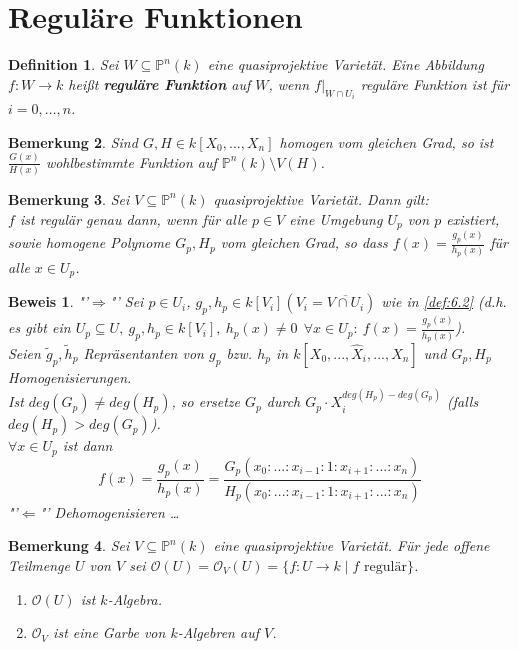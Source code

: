 \documentclass[a4paper,12pt]{report}
\theoremstyle{break}
\newtheorem{Def}{Definition}[section]
\newtheorem{Bem}[Def]{Bemerkung}
\theoremstyle{nonumberbreak}
\theoremstyle{nonumberplain}
\newtheorem{Bew}{Beweis}
\newcommand{\emp}[1]{\textbf{\emph{#1}}}
\newcommand{\begriff}[1]{{\index{#1}}\emp{#1}}
\begin{document}
\section{Reguläre Funktionen}
\begin{Def}
\label{def:10.1}
Sei $W\subseteq\mathbb{P}^n(k)$ eine quasiprojektive Varietät. Eine Abbildung $f:W\rightarrow k$ heißt \begriff{reguläre Funktion} auf $W$, wenn $f|_{W\cap U_i}$ reguläre Funktion ist für $i=0,\dots,n$.
\end{Def}
\begin{Bem}
\label{bem:10.2}
Sind $G,H\in k[X_0,...,X_n]$ homogen vom gleichen Grad, so ist $\frac{G(x)}{H(x)}$ wohlbestimmte Funktion auf $\mathbb{P}^n(k)\setminus V(H)$.
\end{Bem}

\begin{Bem}
\label{bem:10.3}
Sei $V\subseteq\mathbb{P}^n(k)$ quasiprojektive Varietät. Dann gilt:\\
$f$ ist regulär genau dann, wenn für alle $p\in V$ eine Umgebung $U_p$ von $p$ existiert, sowie homogene Polynome $G_p, H_p$ vom gleichen Grad, so dass $f(x)=\frac{g_p(x)}{h_p(x)}$ für alle $x\in U_p$.
\end{Bem}

\begin{Bew} "'$\Rightarrow$"' Sei $p\in U_i$, $g_p,h_p\in k[V_i](V_i=\overline{V\cap U_i})$ wie in \ref{def:6.2} (d.h. es gibt ein $U_p\subseteq U,~g_p,h_p\in k[V_i],~h_p(x)\neq 0 ~~\forall x\in U_p: ~f(x)=\frac{g_p(x)}{h_p(x)}$).\\
Seien $\tilde{g}_p, \tilde{h}_p$ Repräsentanten von $g_p$ bzw. $h_p$ in $k[X_0,...,\hat{X}_i,...,X_n]$ und $G_p, H_p$ Homogenisierungen.\\
Ist $deg(G_p)\neq deg(H_p)$, so ersetze $G_p$ durch $G_p\cdot X_i^{deg(H_p)-deg(G_p)}$ (falls $deg(H_p)>deg(G_p)$).\\
$\forall x\in U_p$ ist dann $$f(x)=\frac{g_p(x)}{h_p(x)}=\frac{G_p(x_0:...:x_{i-1}:1:x_{i+1}:...:x_n)}{H_p(x_0:...:x_{i-1}:1:x_{i+1}:...:x_n)}$$
"'$\Leftarrow$"' Dehomogenisieren \dots
\end{Bew}
\begin{Bem}
Sei $V\subseteq\mathbb{P}^n(k)$ eine quasiprojektive Varietät. Für jede offene Teilmenge $U$ von $V$ sei $\mathcal{O}(U)=\mathcal{O}_V(U)=\{f: U\rightarrow k \mid f \text{ regulär} \}$.
\begin{enumerate}
\item $\mathcal{O}(U)$ ist $k$-Algebra.\\
\item $\mathcal{O}_V$ ist eine Garbe von $k$-Algebren auf $V$.
\end{enumerate}
\end{Bem}
\end{document}
